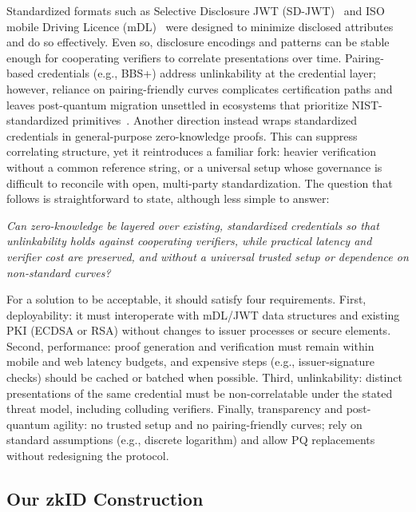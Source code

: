 Standardized formats such as Selective Disclosure JWT (SD-JWT)~ \cite{IETF:FetYasCam25} and ISO mobile Driving Licence (mDL)~\cite{ISO:18013-5} were designed to minimize disclosed attributes and do so effectively. Even so, disclosure encodings and patterns can be stable enough for cooperating verifiers to correlate presentations over time. Pairing-based credentials (e.g., BBS+\cite{C:BCTV14}) address unlinkability at the credential layer; however, reliance on pairing-friendly curves complicates certification paths and leaves post-quantum migration unsettled in ecosystems that prioritize NIST-standardized primitives~\cite{EC:TesZhu23b}. Another direction instead wraps standardized credentials in general-purpose zero-knowledge proofs. This can suppress correlating structure, yet it reintroduces a familiar fork: heavier verification without a common reference string, or a universal setup whose governance is difficult to reconcile with open, multi-party standardization. The question that follows is straightforward to state, although less simple to answer:
\begin{center}
    \textit{Can zero-knowledge be layered over existing, standardized credentials so that unlinkability holds against cooperating verifiers, while practical latency and verifier cost are preserved, and without a universal trusted setup or dependence on non-standard curves?}
\end{center}

For a solution to be acceptable, it should satisfy four requirements. First, deployability: it must interoperate with mDL/JWT data structures and existing PKI (ECDSA or RSA) without changes to issuer processes or secure elements. Second, performance: proof generation and verification must remain within mobile and web latency budgets, and expensive steps (e.g., issuer-signature checks) should be cached or batched when possible. Third, unlinkability: distinct presentations of the same credential must be non-correlatable under the stated threat model, including colluding verifiers. Finally, transparency and post-quantum agility: no trusted setup and no pairing-friendly curves; rely on standard assumptions (e.g., discrete logarithm) and allow PQ replacements without redesigning the protocol.

\subsection{Our zkID Construction}

